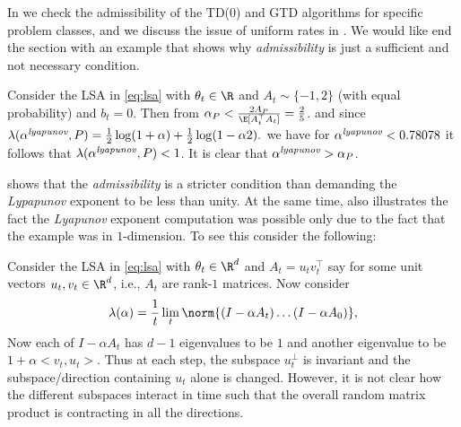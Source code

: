 In  we check the admissibility of the TD(0) and GTD algorithms for specific problem classes, and we discuss the issue of uniform rates in \Cref{}. We would like end the section with an example that shows why \emph{admissibility} is just a sufficient and not necessary condition.
\begin{example}\label{ex:logexp}
Consider the LSA in \eqref{eq:lsa} with $\theta_t\in \R$ and $A_t\sim \{-1, 2\}$ (with equal probability)  and $b_t=0$. Then from 
$
\alpha_{P}<\frac{2A_P}{\E[A_t^\top A_t]}=\frac{2}{5}
$. 
and since 
$
\lambda(\alpha^{\emph{lyapunov}},P)=\frac{1}{2}\log(1+\alpha)+\frac{1}{2}\log(1-\alpha 2).
$
we have for $\alpha^{\emph{lyapunov}}<0.78078$ it follows that $\lambda(\alpha^{\emph{lyapunov}},P)<1$. It is clear that $\alpha^{\emph{lyapunov}}>\alpha_P$.
 \end{example}
 shows that the \emph{admissibility} is a stricter condition than demanding the \emph{Lypapunov} exponent to be less than unity. At the same time,  also illustrates the fact the \emph{Lyapunov} exponent computation was possible only due to the fact that the example was in $1$-dimension. To see this consider the following:
\begin{example}\label{ex:}
Consider the LSA in \eqref{eq:lsa} with $\theta_t\in \R^d$ and $A_t=u_tv_t^\top$ say for some unit vectors $u_t,v_t\in \R^{d}$, i.e., $A_t$ are rank-$1$ matrices. Now consider 
\begin{align*}
\lambda(\alpha)=\frac{1}{t}\lim_t\norm{(I-\alpha A_t)\ldots (I-\alpha A_0)},
\end{align*}
Now each of $I-\alpha A_t$ has $d-1$ eigenvalues to be $1$ and another eigenvalue to be $1+\alpha<v_t,u_t>$. Thus at each step, the subspace $u_t^\perp$ is invariant and the subspace/direction containing $u_t$ alone is changed. However, it is not clear how the different subspaces interact in time such that the overall random matrix product is contracting in all the directions.
\end{example}
\begin{comment}
From \eqref{prop:unistep} it is clear that unless we bring in some problem structure it is not possible in general to ensure a universal step-size choice. We now define the notion of \emph{admissibility} of a problem class $\P$:
\end{comment}


\begin{comment}
\begin{definition}
Call a set of distributions $\P$ over $\C^{d}\times \C^{\dcd}$ \emph{admissible}
if there exists some $\alpha_{\P}>0$ such that $\inf_{P\in \P} \rhos{P}>0$ holds for all $\alpha\in(0,\alpha_{\P})$.
The value of $\alpha_{\P}$ is called a witness.
\end{definition}
\end{comment}



